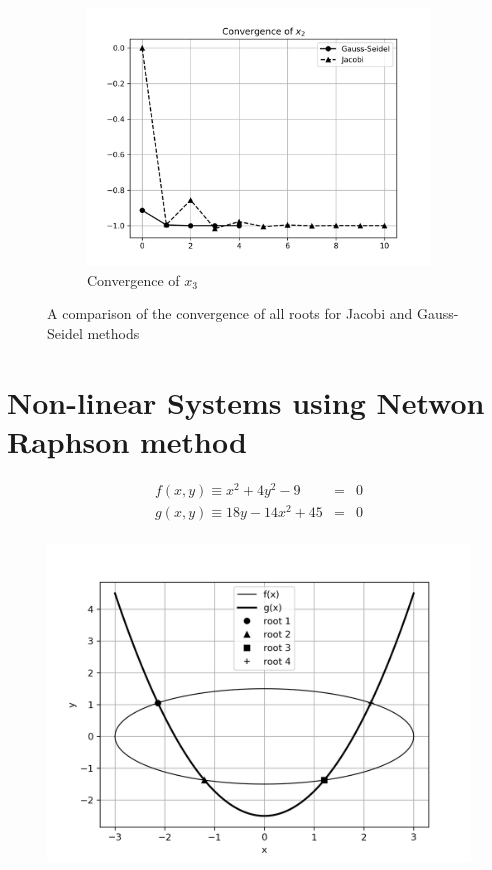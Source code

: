 \documentclass[12,a4paper]{article}
\begin{document}
\begin{figure}[H]
\begin{subfigure}[t]{0.49\textwidth}
            \includegraphics[width=\textwidth]{plots/Convergence_of_x2.png}
            \caption{Convergence of $x_3$}
            \label{fig:conv_x3}
        \end{subfigure}
        \caption{A comparison of the convergence of all roots for Jacobi and Gauss-Seidel methods}
    \end{figure}
    
    
    \newpage
    \section{Non-linear Systems using Netwon Raphson method}
    
    \begin{eqnarray*}
        f(x,y) \equiv x^2 + 4y^2 - 9 &=& 0 \\
        g(x,y) \equiv 18y - 14x^2 + 45 &=& 0 \\
    \end{eqnarray*}
    
    \begin{figure}[H]
        \centering
        \includegraphics[width = \textwidth]{plots/non-linear.png}
    \end{figure}
    
\end{document}
